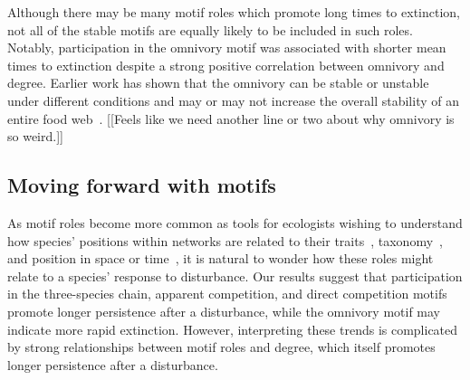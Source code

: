\documentclass[12pt]{article}
\begin{document}
\begin{spacing}{2.0}
        Although there may be many motif roles which promote long times to extinction, not all of the stable motifs are equally likely to be included in such roles.
        Notably, participation in the omnivory motif was associated with shorter mean times to extinction despite a strong positive correlation between omnivory and degree. 
        Earlier work has shown that the omnivory can be stable or unstable under different conditions and may or may not increase the overall stability of an entire food web~\citep{McCann1997,Emmerson2004,Borrelli2015a,Monteiro2016}.
        [[Feels like we need another line or two about why omnivory is so weird.]]


	\subsection*{Moving forward with motifs}	

        As motif roles become more common as tools for ecologists wishing to understand how species' positions within networks are related to their traits~\citep{Cirtwill2018EcolLett}, taxonomy~\citep{Stouffer2007}, and position in space or time~\citep{Baker2015}, it is natural to wonder how these roles might relate to a species' response to disturbance. 
        Our results suggest that participation in the three-species chain, apparent competition, and direct competition motifs promote longer persistence after a disturbance, while the omnivory motif may indicate more rapid extinction.
        However, interpreting these trends is complicated by strong relationships between motif roles and degree, which itself promotes longer persistence after a disturbance.
        

\end{spacing}
\end{document}
